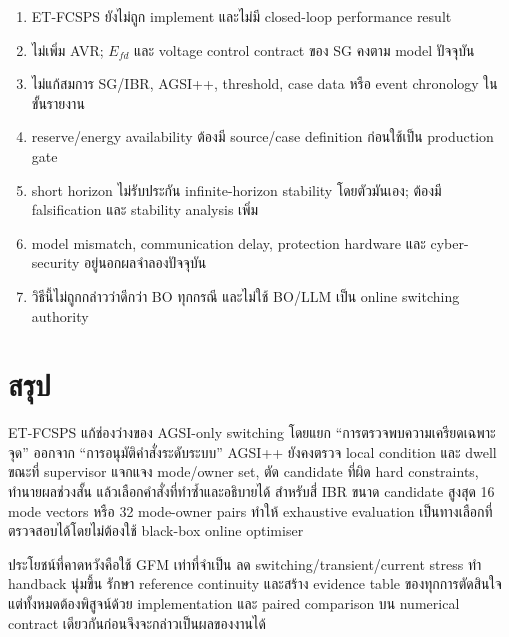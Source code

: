 \documentclass[12pt,a4paper]{article}
\begin{document}
\begin{enumerate}
  \item ET-FCSPS ยังไม่ถูก implement และไม่มี closed-loop performance result
  \item ไม่เพิ่ม AVR; $E_{fd}$ และ voltage control contract ของ SG คงตาม model ปัจจุบัน
  \item ไม่แก้สมการ SG/IBR, AGSI++, threshold, case data หรือ event chronology ในขั้นรายงาน
  \item reserve/energy availability ต้องมี source/case definition ก่อนใช้เป็น production gate
  \item short horizon ไม่รับประกัน infinite-horizon stability โดยตัวมันเอง; ต้องมี falsification และ stability analysis เพิ่ม
  \item model mismatch, communication delay, protection hardware และ cyber-security อยู่นอกผลจำลองปัจจุบัน
  \item วิธีนี้ไม่ถูกกล่าวว่าดีกว่า BO ทุกกรณี และไม่ใช้ BO/LLM เป็น online switching authority
\end{enumerate}

\section{สรุป}

ET-FCSPS แก้ช่องว่างของ AGSI-only switching โดยแยก ``การตรวจพบความเครียดเฉพาะจุด'' ออกจาก
``การอนุมัติคำสั่งระดับระบบ'' AGSI++ ยังคงตรวจ local condition และ dwell ขณะที่ supervisor แจกแจง
mode/owner set, ตัด candidate ที่ผิด hard constraints, ทำนายผลช่วงสั้น แล้วเลือกคำสั่งที่ทำซ้ำและอธิบายได้
สำหรับสี่ IBR ขนาด candidate สูงสุด 16 mode vectors หรือ 32 mode-owner pairs ทำให้ exhaustive evaluation
เป็นทางเลือกที่ตรวจสอบได้โดยไม่ต้องใช้ black-box online optimiser

ประโยชน์ที่คาดหวังคือใช้ GFM เท่าที่จำเป็น ลด switching/transient/current stress ทำ handback นุ่มขึ้น
รักษา reference continuity และสร้าง evidence table ของทุกการตัดสินใจ แต่ทั้งหมดต้องพิสูจน์ด้วย implementation
และ paired comparison บน numerical contract เดียวกันก่อนจึงจะกล่าวเป็นผลของงานได้
\end{document}
